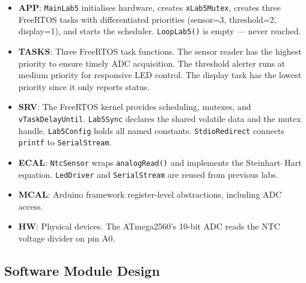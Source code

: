 \documentclass[12pt]{article}
\begin{document}
\begin{itemize}
  \item \textbf{APP}: \texttt{MainLab5} initialises hardware, creates \texttt{xLab5Mutex}, creates three FreeRTOS tasks with differentiated priorities (sensor=3, threshold=2, display=1), and starts the scheduler. \texttt{LoopLab5()} is empty --- never reached.
  \item \textbf{TASKS}: Three FreeRTOS task functions. The sensor reader has the highest priority to ensure timely ADC acquisition. The threshold alerter runs at medium priority for responsive LED control. The display task has the lowest priority since it only reports status.
  \item \textbf{SRV}: The FreeRTOS kernel provides scheduling, mutexes, and \texttt{vTaskDelayUntil}. \texttt{Lab5Sync} declares the shared volatile data and the mutex handle. \texttt{Lab5Config} holds all named constants. \texttt{StdioRedirect} connects \texttt{printf} to \texttt{SerialStream}.
  \item \textbf{ECAL}: \texttt{NtcSensor} wraps \texttt{analogRead()} and implements the Steinhart--Hart equation. \texttt{LedDriver} and \texttt{SerialStream} are reused from previous labs.
  \item \textbf{MCAL}: Arduino framework register-level abstractions, including ADC access.
  \item \textbf{HW}: Physical devices. The ATmega2560's 10-bit ADC reads the NTC voltage divider on pin A0.
\end{itemize}

\subsection{Software Module Design}
\end{document}
